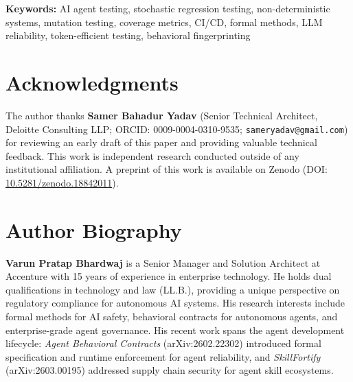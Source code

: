 \documentclass[11pt,a4paper]{article}
\theoremstyle{definition}
\theoremstyle{plain}
\theoremstyle{remark}
\begin{document}
\noindent\textbf{Keywords:} AI agent testing, stochastic regression testing,
non-deterministic systems, mutation testing, coverage metrics, CI/CD,
formal methods, LLM reliability, token-efficient testing, behavioral
fingerprinting

\vspace{1em}













\section*{Acknowledgments}

The author thanks \textbf{Samer Bahadur Yadav} (Senior Technical
Architect, Deloitte Consulting LLP; ORCID: 0009-0004-0310-9535;
\texttt{sameryadav@gmail.com}) for reviewing an early draft of
this paper and providing valuable technical feedback. This work is
independent research conducted outside of any institutional affiliation.
A preprint of this work is available on Zenodo
(DOI: \href{https://doi.org/10.5281/zenodo.18842011}{10.5281/zenodo.18842011}).

\section*{Author Biography}

\textbf{Varun Pratap Bhardwaj} is a Senior Manager and Solution
Architect at Accenture with 15 years of experience in enterprise
technology. He holds dual qualifications in technology and law (LL.B.),
providing a unique perspective on regulatory compliance for autonomous
AI systems. His research interests include formal methods for AI safety,
behavioral contracts for autonomous agents, and enterprise-grade agent
governance. His recent work spans the agent development lifecycle:
\emph{Agent Behavioral Contracts} (arXiv:2602.22302) introduced formal
specification and runtime enforcement for agent reliability, and
\emph{SkillFortify} (arXiv:2603.00195) addressed supply chain security
for agent skill ecosystems.
\end{document}
